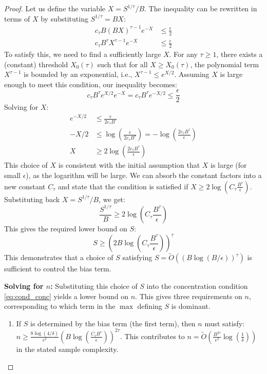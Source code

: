 \documentclass[11pt]{article}
\newcounter{thm}
\numberwithin{thm}{section}
\theoremstyle{plain}
\theoremstyle{definition}
\theoremstyle{remark} \newtheorem{remark}[thm]{Remark}
\begin{document}
\begin{proof}
Let us define the variable $X = S^{1/\tau}/B$. The inequality can be rewritten in terms of $X$ by substituting $S^{1/\tau} = BX$:
\begin{align*}
c_\tau B (BX)^{\tau-1} e^{-X} &\le \frac{\epsilon}{2} \\
c_\tau B^\tau X^{\tau-1} e^{-X} &\le \frac{\epsilon}{2}
\end{align*}
To satisfy this, we need to find a sufficiently large $X$. For any $\tau \ge 1$, there exists a (constant) threshold $X_0(\tau)$ such that for all $X \ge X_0(\tau)$, the polynomial term $X^{\tau-1}$ is bounded by an exponential, i.e., $X^{\tau-1} \le e^{X/2}$. Assuming $X$ is large enough to meet this condition, our inequality becomes:
\[
c_\tau B^\tau e^{X/2} e^{-X} = c_\tau B^\tau e^{-X/2} \le \frac{\epsilon}{2}
\]
Solving for $X$:
\begin{align*}
e^{-X/2} &\le \frac{\epsilon}{2 c_\tau B^\tau} \\
-X/2 &\le \log\left(\frac{\epsilon}{2 c_\tau B^\tau}\right) = -\log\left(\frac{2 c_\tau B^\tau}{\epsilon}\right) \\
X &\ge 2 \log\left(\frac{2 c_\tau B^\tau}{\epsilon}\right)
\end{align*}
This choice of $X$ is consistent with the initial assumption that $X$ is large (for small $\epsilon$), as the logarithm will be large. We can absorb the constant factors into a new constant $C_\tau$ and state that the condition is satisfied if
$
X \ge 2\log\left(C_\tau \frac{B^\tau}{\epsilon}\right).
$
Substituting back $X = S^{1/\tau}/B$, we get:
\[
\frac{S^{1/\tau}}{B} \ge 2\log\left(C_\tau \frac{B^\tau}{\epsilon}\right)
\]
This gives the required lower bound on $S$:
\[
S \ge \left(2B \log\left(C_\tau \frac{B^\tau}{\epsilon}\right)\right)^\tau
\]
This demonstrates that a choice of $S$ satisfying $S = \tilde{O}((B \log(B/\epsilon))^\tau)$ is sufficient to control the bias term.

\textbf{Solving for $n$:} Substituting this choice of $S$ into the concentration condition \eqref{eq:cond_conc} yields a lower bound on $n$. This gives three requirements on $n$, corresponding to which term in the $\max$ defining $S$ is dominant.
\begin{enumerate}
    \item If $S$ is determined by the bias term (the first term), then $n$ must satisfy:
    $n \ge \frac{8 \log(4/\delta)}{\epsilon^2} \left(B \log\left(\frac{C_\tau B^\tau}{\epsilon}\right)\right)^{2\tau}.$
    This contributes to $n = \tilde{O}\left(\frac{B^{2\tau}}{\epsilon^2} \log\left(\frac 1 \delta \right)\right)$ in the stated sample complexity.
    

\end{enumerate}
\end{proof}
\end{document}
